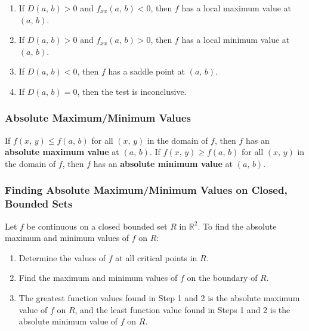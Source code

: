 \begin{enumerate}
    \item If $D(a,\, b) > 0$ and $f_{xx} (a,\, b) < 0$, then $f$ has a local maximum value at $(a,\, b)$.
    \item If $D(a,\, b) > 0$ and $f_{xx} (a,\, b) > 0$, then $f$ has a local minimum value at $(a,\, b)$.
    \item If $D(a,\, b) < 0$, then $f$ has a saddle point at $(a,\, b)$.
    \item If $D(a,\, b) = 0$, then the test is inconclusive.
\end{enumerate}

\subsubsection{Absolute Maximum/Minimum Values}
If $f(x,\, y) \leq f(a,\, b)$ for all $(x,\, y)$ in the domain of $f$, then $f$ has an \textbf{absolute maximum value} at $(a,\, b)$. If $f(x,\, y) \geq f(a,\, b)$ for all $(x,\, y)$ in the domain of $f$, then $f$ has an \textbf{absolute minimum value} at $(a,\, b)$.

\subsubsection{Finding Absolute Maximum/Minimum Values on Closed, Bounded Sets}
Let $f$ be continuous on a closed bounded set $R$ in $\mathbb{R}^2$. To find the absolute maximum and minimum values of $f$ on $R$:

\begin{enumerate}
    \item Determine the values of $f$ at all critical points in $R$.
    \item Find the maximum and minimum values of $f$ on the boundary of $R$.
    \item The greatest function values found in Step 1 and 2 is the absolute maximum value of $f$ on $R$, and the least function value found in Steps 1 and 2 is the absolute minimum value of $f$ on $R$.
\end{enumerate}
